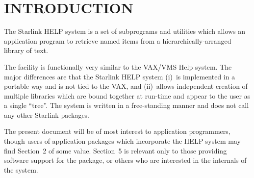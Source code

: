 \newcommand{\fstring}[1]{\hbox{\hspace{0.05em}$'${\tt #1}\hspace{0.05em}$'$}}

\renewcommand{\_}{{\tt\char'137}}

\newpage

\section{INTRODUCTION}
The Starlink HELP system is a set of subprograms and utilities which
allows an application program to retrieve named items from
a hierarchically-arranged library of text.

The facility is functionally
very similar to the VAX/VMS Help system.  The major differences
are that the Starlink HELP system (i)~is implemented in
a portable way and is not tied to the VAX, and (ii)~allows
independent creation of multiple libraries which
are bound together at run-time and appear to the user as a single
``tree''.  The system is written in a free-standing manner and does not call
any other Starlink packages.

The present document will be of most interest to application programmers,
though users of application packages which incorporate the HELP system
may find Section~2 of some
value.  Section~5 is
relevant only to those providing software support for the package,
or others who are interested in the internals of the system.

